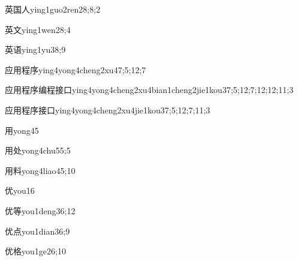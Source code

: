\begin{verbete}{英国人}{ying1guo2ren2}{8;8;2}
\end{verbete}
\begin{verbete}{英文}{ying1wen2}{8;4}
\end{verbete}
\begin{verbete}{英语}{ying1yu3}{8;9}
\end{verbete}
\begin{verbete}{应用程序}{ying4yong4cheng2xu4}{7;5;12;7}
\end{verbete}
\begin{extragrande}{应用程序编程接口}{ying4yong4cheng2xu4bian1cheng2jie1kou3}{7;5;12;7;12;12;11;3}
\end{extragrande}
\begin{extragrande}{应用程序接口}{ying4yong4cheng2xu4jie1kou3}{7;5;12;7;11;3}
\end{extragrande}
\begin{verbete}{用}{yong4}{5}
\end{verbete}
\begin{verbete}{用处}{yong4chu5}{5;5}
\end{verbete}
\begin{verbete}{用料}{yong4liao4}{5;10}
\end{verbete}
\begin{verbete}{优}{you1}{6}
\end{verbete}
\begin{verbete}{优等}{you1deng3}{6;12}
\end{verbete}
\begin{verbete}{优点}{you1dian3}{6;9}
\end{verbete}
\begin{verbete}{优格}{you1ge2}{6;10}
\end{verbete}
